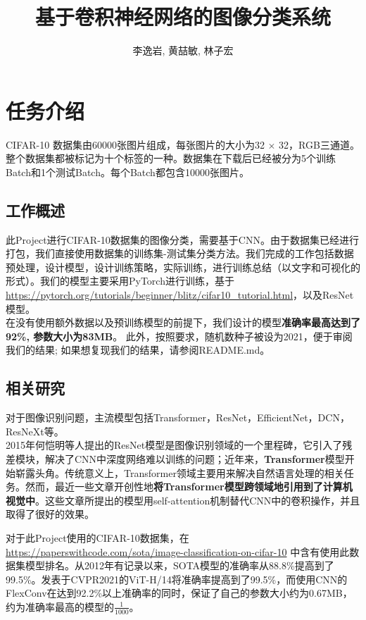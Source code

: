 \documentclass[hyperref, UTF8, 12pt]{article}
\theoremstyle{definition}
\begin{document}
\title{基于卷积神经网络的图像分类系统}
\author{李逸岩, 黄喆敏, 林子宏}
\maketitle

\section{任务介绍}
CIFAR-10 数据集由60000张图片组成，每张图片的大小为32 $\times$ 32，RGB三通道。整个数据集都被标记为十个标签的一种。数据集在下载后已经被分为5个训练Batch和1个测试Batch。每个Batch都包含10000张图片。\cite{2009learning}

\subsection{工作概述}
此Project进行CIFAR-10数据集的图像分类，需要基于CNN。由于数据集已经进行打包，我们直接使用数据集的训练集-测试集分类方法。我们完成的工作包括数据预处理，设计模型，设计训练策略，实际训练，进行训练总结（以文字和可视化的形式）。我们的模型主要采用PyTorch进行训练，基于\url{https://pytorch.org/tutorials/beginner/blitz/cifar10_tutorial.html}，以及ResNet模型。 \\
\indent
在没有使用额外数据以及预训练模型的前提下，我们设计的模型\textbf{准确率最高达到了92\%, 参数大小为83MB}。 此外，按照要求，随机数种子被设为2021，便于审阅我们的结果; 如果想复现我们的结果，请参阅README.md。

\subsection {相关研究}
对于图像识别问题，主流模型包括Transformer\cite{dosovitskiy2021image}，ResNet\cite{kolesnikov2020big}，EfficientNet\cite{tan2021efficientnetv2}，DCN\cite{sousa2021cnn}，ResNeXt\cite{Li_2019_CVPR}等。\\

\indent 2015年何恺明等人提出的ResNet模型\cite{resnet2016}是图像识别领域的一个里程碑，它引入了残差模块，解决了CNN中深度网络难以训练的问题；近年来，\textbf{Transformer}模型开始崭露头角。传统意义上，Transformer领域主要用来解决自然语言处理的相关任务。然而，最近一些文章开创性地\textbf{将Transformer模型跨领域地引用到了计算机视觉中}。这些文章所提出的模型用self-attention机制替代CNN中的卷积操作，并且取得了很好的效果。\cite{dosovitskiy2021image}

\indent 对于此Project使用的CIFAR-10数据集，在\url{https://paperswithcode.com/sota/image-classification-on-cifar-10} 中含有使用此数据集模型排名。从2012年有记录以来，SOTA模型的准确率从88.8\%提高到了99.5\%。发表于CVPR2021的ViT-H/14将准确率提高到了99.5\%\cite{dosovitskiy2021image}，而使用CNN的FlexConv在达到92.2\%以上准确率的同时\cite{romero2021flexconv}，保证了自己的参数大小约为0.67MB，约为准确率最高的模型的$\frac{1}{1000}$。
\end{document}
